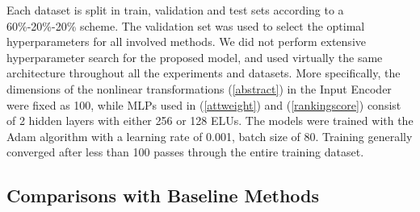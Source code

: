 \documentclass[letterpaper]{article}
\begin{document}
Each dataset is split in train, validation and test sets according to a 60\%-20\%-20\% scheme. The validation set was used to select the optimal hyperparameters for all involved methods. We did not perform extensive hyperparameter search for the proposed model, and used virtually the same architecture throughout all the experiments and datasets. More specifically, the dimensions of the nonlinear transformations (\ref{abstract}) in the Input Encoder were fixed as 100, while MLPs used in (\ref{attweight}) and (\ref{rankingscore}) consist of 2 hidden layers with either 256 or 128 ELUs. The models were trained with the Adam algorithm \cite{kingma2014adam} with a learning rate of 0.001, batch size of 80. Training generally converged after less than 100 passes through the entire training dataset.

\subsection{Comparisons with Baseline Methods}
\end{document}
